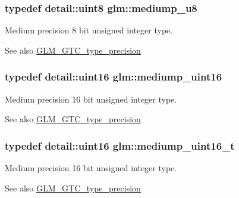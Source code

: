 \subsubsection[{mediump\+\_\+u8}]{\setlength{\rightskip}{0pt plus 5cm}typedef {\bf detail\+::uint8} {\bf glm\+::mediump\+\_\+u8}}\label{group__gtc__type__precision_gac04b372784392e82bd557f300c4de097}
Medium precision 8 bit unsigned integer type. \begin{DoxySeeAlso}{See also}
\hyperlink{group__gtc__type__precision}{G\+L\+M\+\_\+\+G\+T\+C\+\_\+type\+\_\+precision} 
\end{DoxySeeAlso}
\hypertarget{group__gtc__type__precision_ga2cef3a0d7b0fce75c9885f64656d8933}{}
\subsubsection[{mediump\+\_\+uint16}]{\setlength{\rightskip}{0pt plus 5cm}typedef {\bf detail\+::uint16} {\bf glm\+::mediump\+\_\+uint16}}\label{group__gtc__type__precision_ga2cef3a0d7b0fce75c9885f64656d8933}
Medium precision 16 bit unsigned integer type. \begin{DoxySeeAlso}{See also}
\hyperlink{group__gtc__type__precision}{G\+L\+M\+\_\+\+G\+T\+C\+\_\+type\+\_\+precision} 
\end{DoxySeeAlso}
\hypertarget{group__gtc__type__precision_ga0b385466deac5ac96061ef2cdd6db20f}{}
\subsubsection[{mediump\+\_\+uint16\+\_\+t}]{\setlength{\rightskip}{0pt plus 5cm}typedef {\bf detail\+::uint16} {\bf glm\+::mediump\+\_\+uint16\+\_\+t}}\label{group__gtc__type__precision_ga0b385466deac5ac96061ef2cdd6db20f}
Medium precision 16 bit unsigned integer type. \begin{DoxySeeAlso}{See also}
\hyperlink{group__gtc__type__precision}{G\+L\+M\+\_\+\+G\+T\+C\+\_\+type\+\_\+precision} 
\end{DoxySeeAlso}
\hypertarget{group__gtc__type__precision_ga861dbd1051f488e425b3966001b568e5}{}
